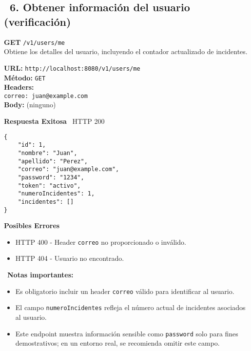 \subsection*{\faServer\ 6. Obtener información del usuario (verificación)}

\begin{tcolorbox}[endpoint]
    \textbf{GET} \texttt{/v1/users/me}\\
    Obtiene los detalles del usuario, incluyendo el contador actualizado de incidentes.
\end{tcolorbox}

\begin{tcolorbox}[request]
    \textbf{URL:} \textcolor{urlColor}{\texttt{http://localhost:8080/v1/users/me}}\\
    \textbf{Método:} \textcolor{methodColor}{\texttt{GET}}\\
    \textbf{Headers:}\\
    \textcolor{headerColor}{\texttt{correo: juan@example.com}}\\
    \textbf{Body:} (ninguno)
\end{tcolorbox}

\begin{tcolorbox}[response]
    \textbf{Respuesta Exitosa} \faCheckCircle\ \textcolor{successColor}{HTTP 200}
    \begin{verbatim}
{
    "id": 1,
    "nombre": "Juan",
    "apellido": "Perez",
    "correo": "juan@example.com",
    "password": "1234",
    "token": "activo",
    "numeroIncidentes": 1,
    "incidentes": []
}
    \end{verbatim}
    
    \textbf{Posibles Errores} \faExclamationTriangle
    \begin{itemize}
        \item \textcolor{errorColor}{HTTP 400} - Header \texttt{correo} no proporcionado o inválido.
        \item \textcolor{errorColor}{HTTP 404} - Usuario no encontrado.
    \end{itemize}
\end{tcolorbox}

\begin{tcolorbox}[notes]
    \faInfoCircle\ \textbf{Notas importantes:}
    \begin{itemize}
        \item Es obligatorio incluir un header \texttt{correo} válido para identificar al usuario.
        \item El campo \texttt{numeroIncidentes} refleja el número actual de incidentes asociados al usuario.
        \item Este endpoint muestra información sensible como \texttt{password} solo para fines demostrativos; en un entorno real, se recomienda omitir este campo.
    \end{itemize}
\end{tcolorbox}

